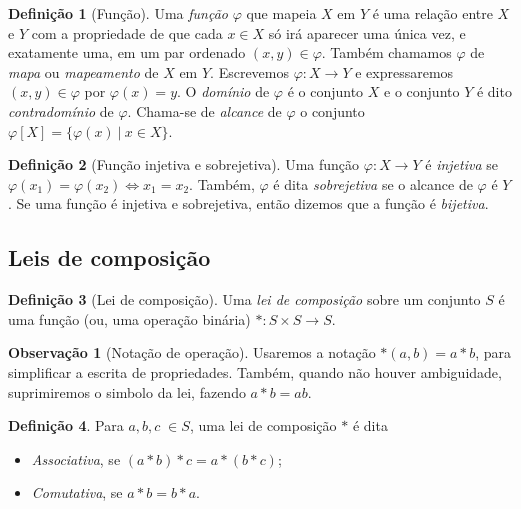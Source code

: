 \documentclass[a4paper,12pt]{report}
\theoremstyle{plain}
\theoremstyle{definition}
\newtheorem{definicao}{Definição}[section]
\newtheorem{observacao}{Observação}[section]
\begin{document}
\begin{definicao}[Função]
		Uma \emph{função} $\varphi$ que mapeia $X$ em $Y$ é uma relação entre $X$ e $Y$ com a propriedade de que cada $x\in X$ só irá aparecer uma única vez, e exatamente uma, em um par ordenado $(x,y)\in \varphi$. Também chamamos $\varphi$ de \emph{mapa} ou \emph{mapeamento} de $X$ em $Y$. Escrevemos $\varphi: X\longrightarrow Y$ e expressaremos $(x,y)\in\varphi$ por $\varphi(x) = y$. O \emph{domínio} de $\varphi$ é o conjunto $X$ e o conjunto $Y$ é dito \emph{contradomínio} de $\varphi$. Chama-se de \emph{alcance} de $\varphi$ o conjunto $\varphi[X] = \{\varphi(x)\ | \ x \in X\}.$
\end{definicao}

\begin{definicao}[Função injetiva e sobrejetiva]
		Uma função $\varphi: X \longrightarrow Y$ é \emph{injetiva} se $\varphi(x_1) = \varphi(x_2) \iff x_1 = x_2$. Também, $\varphi$ é dita \emph{sobrejetiva} se o alcance de $\varphi$ é $Y$. Se uma função é injetiva e sobrejetiva, então dizemos que a função é \emph{bijetiva}.
\end{definicao}

\subsection{Leis de composição}

\begin{definicao}[Lei de composição]
	Uma \emph{lei de composição} sobre um conjunto \(S\) é uma função (ou, uma operação binária) \(*: S\times S \longrightarrow S\).
\end{definicao}

\begin{observacao}[Notação de operação]
	Usaremos a notação \(*(a,b) = a*b\), para simplificar a escrita de
	propriedades. Também, quando não houver ambiguidade, suprimiremos o simbolo da lei, fazendo $a*b = ab$.
\end{observacao}


\begin{definicao}
	Para $a,b,c \; \in S$, uma lei de composição $*$ é dita
	
	\begin{itemize}
		\item \emph{Associativa}, se $(a*b)*c = a*(b*c)$;
		\item \emph{Comutativa}, se \(a*b = b*a\).
	\end{itemize}
\end{definicao}
\end{document}
